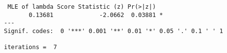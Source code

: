 \begin{verbatim} MLE of lambda Score Statistic (z) Pr(>|z|)  
       0.13681             -2.0662  0.03881 *
---
Signif. codes:  0 '***' 0.001 '**' 0.01 '*' 0.05 '.' 0.1 ' ' 1

iterations =  7 
\end{verbatim}